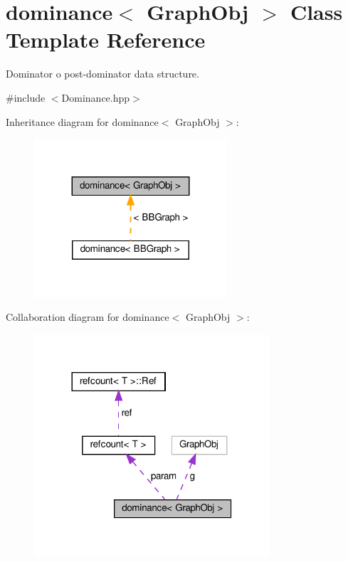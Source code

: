 \hypertarget{classdominance}{}\section{dominance$<$ Graph\+Obj $>$ Class Template Reference}
\label{classdominance}


Dominator o post-\/dominator data structure.  




{\ttfamily \#include $<$Dominance.\+hpp$>$}



Inheritance diagram for dominance$<$ Graph\+Obj $>$\+:
\nopagebreak
\begin{figure}[H]
\begin{center}
\leavevmode
\includegraphics[width=203pt]{d9/d69/classdominance__inherit__graph}
\end{center}
\end{figure}


Collaboration diagram for dominance$<$ Graph\+Obj $>$\+:
\nopagebreak
\begin{figure}[H]
\begin{center}
\leavevmode
\includegraphics[width=248pt]{d4/d5a/classdominance__coll__graph}
\end{center}
\end{figure}
